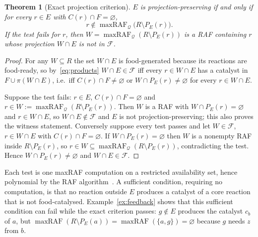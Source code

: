 \documentclass[11pt,a4paper]{article}
\theoremstyle{plain}
\newtheorem{theorem}{Theorem}[section]
\theoremstyle{definition}
\theoremstyle{remark}
\newcommand{\FF}{\mathcal F}
\newcommand{\QQ}{\mathcal Q}
\newcommand{\mraf}{\operatorname{maxRAF}}
\begin{document}
\begin{theorem}[Exact projection criterion]\label{thm:projection}
$E$ is projection-preserving if and only if for every $r\in E$ with $C(r)\cap F=\varnothing$,
\[
r\notin\mraf_\QQ\bigl(R\setminus P_E(r)\bigr).
\]
If the test fails for $r$, then $W=\mraf_\QQ(R\setminus P_E(r))$ is a RAF containing $r$
whose projection $W\cap E$ is not in $\FF$.
\end{theorem}
\begin{proof}
For any $W\subseteq R$ the set $W\cap E$ is food-generated because its reactions are
food-ready, so by~\eqref{eq:products} $W\cap E\in\FF$ iff every $r\in W\cap E$ has a
catalyst in $F\cup\pi(W\cap E)$, i.e.\ iff $C(r)\cap F\neq\varnothing$ or
$W\cap P_E(r)\neq\varnothing$ for every $r\in W\cap E$.

Suppose the test fails: $r\in E$, $C(r)\cap F=\varnothing$ and $r\in W:=\mraf_\QQ(R\setminus P_E(r))$.
Then $W$ is a RAF with $W\cap P_E(r)=\varnothing$ and $r\in W\cap E$, so $W\cap E\notin\FF$
and $E$ is not projection-preserving; this also proves the witness statement. Conversely
suppose every test passes and let $W\in\FF$, $r\in W\cap E$ with $C(r)\cap F=\varnothing$.
If $W\cap P_E(r)=\varnothing$ then $W$ is a nonempty RAF inside $R\setminus P_E(r)$, so
$r\in W\subseteq\mraf_\QQ(R\setminus P_E(r))$, contradicting the test. Hence
$W\cap P_E(r)\neq\varnothing$ and $W\cap E\in\FF$.
\end{proof}

Each test is one maxRAF computation on a restricted availability set, hence polynomial by
the RAF algorithm~\cite{hordijk2004detecting}. A sufficient condition, requiring no
computation, is that no reaction outside $E$ produces a catalyst of a core reaction that
is not food-catalysed. Example~\ref{ex:feedback} shows that this sufficient condition can
fail while the exact criterion passes: $g\notin E$ produces the catalyst $c_b$ of $a$, but
$\mraf(R\setminus P_E(a))=\mraf(\{a,g\})=\varnothing$ because $g$ needs $z$ from $b$.
\end{document}
